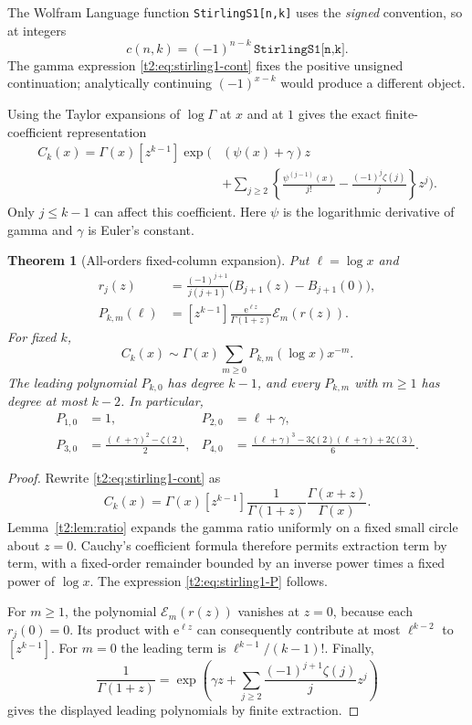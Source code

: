 \documentclass[11pt,openany]{book}
\numberwithin{equation}{chapter}
\theoremstyle{plain}
\newtheorem{theorem}{Theorem}[chapter]
\theoremstyle{definition}
\theoremstyle{remark}
\newcommand{\ee}{\mathrm e}
\newcommand{\cE}{\mathcal E}\newcommand{\cL}{\mathcal L}
\begin{document}
The Wolfram Language function \texttt{StirlingS1[n,k]} uses the \emph{signed} convention, so at integers
\[
 c(n,k)=(-1)^{n-k}\,\texttt{StirlingS1[n,k]}.
\]
The gamma expression \eqref{t2:eq:stirling1-cont} fixes the positive unsigned continuation; analytically continuing $(-1)^{x-k}$ would produce a different object.

Using the Taylor expansions of $\log\Gamma$ at $x$ and at $1$ gives the exact finite-coefficient representation
\begin{align}
 C_k(x)=\Gamma(x)[z^{k-1}]\exp\Bigg(& (\psi(x)+\gamma)z\nonumber\\
 &+\sum_{j\ge2}\left\{\frac{\psi^{(j-1)}(x)}{j!}
                  -\frac{(-1)^j\zeta(j)}j\right\}z^j\Bigg).
 \label{t2:eq:stirling1-polygamma}
\end{align}
Only $j\le k-1$ can affect this coefficient. Here $\psi$ is the logarithmic derivative of gamma and $\gamma$ is Euler's constant.

\begin{theorem}[All-orders fixed-column expansion]
\label{t2:thm:stirling1}
Put $\ell=\log x$ and
\begin{align}
 r_j(z)&=\frac{(-1)^{j+1}}{j(j+1)}
              \bigl(B_{j+1}(z)-B_{j+1}(0)\bigr),\nonumber\\
 P_{k,m}(\ell)&=[z^{k-1}]\frac{\ee^{\ell z}}{\Gamma(1+z)}
                      \cE_m(r(z)).
 \label{t2:eq:stirling1-P}
\end{align}
For fixed $k$,
\begin{equation}
 C_k(x)\sim\Gamma(x)\sum_{m\ge0}P_{k,m}(\log x)x^{-m}.
 \label{t2:eq:stirling1-forward}
\end{equation}
The leading polynomial $P_{k,0}$ has degree $k-1$, and every $P_{k,m}$ with $m\ge1$ has degree at most $k-2$. In particular,
\begin{align}
 P_{1,0}&=1,&P_{2,0}&=\ell+\gamma,\nonumber\\
 P_{3,0}&=\frac{(\ell+\gamma)^2-\zeta(2)}2,&
 P_{4,0}&=\frac{(\ell+\gamma)^3-3\zeta(2)(\ell+\gamma)+2\zeta(3)}6.
 \label{t2:eq:stirling1-leading}
\end{align}
\end{theorem}
\begin{proof}
Rewrite \eqref{t2:eq:stirling1-cont} as
\[
 C_k(x)=\Gamma(x)[z^{k-1}]
        \frac1{\Gamma(1+z)}\frac{\Gamma(x+z)}{\Gamma(x)}.
\]
Lemma~\ref{t2:lem:ratio} expands the gamma ratio uniformly on a fixed small circle about $z=0$. Cauchy's coefficient formula therefore permits extraction term by term, with a fixed-order remainder bounded by an inverse power times a fixed power of $\log x$. The expression \eqref{t2:eq:stirling1-P} follows.

For $m\ge1$, the polynomial $\cE_m(r(z))$ vanishes at $z=0$, because each $r_j(0)=0$. Its product with $\ee^{\ell z}$ can consequently contribute at most $\ell^{k-2}$ to $[z^{k-1}]$. For $m=0$ the leading term is $\ell^{k-1}/(k-1)!$. Finally,
\[
 \frac1{\Gamma(1+z)}
 =\exp\left(\gamma z+\sum_{j\ge2}\frac{(-1)^{j+1}\zeta(j)}jz^j\right)
\]
gives the displayed leading polynomials by finite extraction.
\end{proof}
\end{document}
